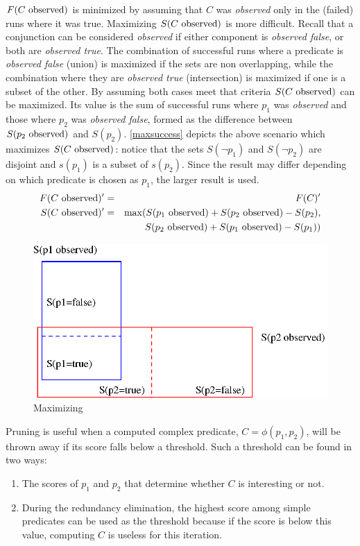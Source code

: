 $F(\text{$C$ observed})$ is minimized by assuming that $C$ was \textit{observed} only in the (failed) runs where it was true.  Maximizing $S(\text{$C$ observed})$ is more difficult.  Recall that a conjunction can be considered \textit{observed} if either component is \textit{observed false}, or both are \textit{observed true}.  The combination of successful runs where a predicate is \textit{observed false} (union) is maximized if the sets are non overlapping, while the combination where they are \textit{observed true} (intersection) is maximized if one is a subset of the other.  By assuming both cases meet that criteria $S(\text{$C$ observed})$ can be maximized.  Its value is the sum of successful runs where $p_1$ was \textit{observed} and those where $p_2$ was \textit{observed false}, formed as the difference between $S(\text{$p_2$ observed})$ and $S(p_2)$.  \autoref{maxsuccess} depicts the above scenario which maximizes $S(\text{$C$ observed})$: notice that the sets $S(\neg p_1)$ and $S(\neg p_2)$ are disjoint and $s(p_1)$ is a subset of $s(p_2)$.  Since the result may differ depending on which predicate is chosen as $p_1$, the larger result is used.
\begin{eqnarray*}
  F(\text{$C$ observed})' &=& F(C)' \\
  S(\text{$C$ observed})' &=&
  \max(S(\text{$p_1$ observed}) + S(\text{$p_2$ observed}) - S(p_2),\\
  & &\ \ \ \ S(\text{$p_2$ observed}) + S(\text{$p_1$ observed}) - S(p_1))
\end{eqnarray*}

\begin{figure}[h]
  \centering
  \includegraphics[scale = 0.6]{charts/maxsuccess}
  \caption{Maximizing }
  \label{maxsuccess}
\end{figure}


Pruning is useful when a computed complex predicate, $C = \phi(p_1, p_2)$, will be thrown away if its score falls below a threshold.  Such a threshold can be found in two ways:
\begin{enumerate}
\item The scores of $p_1$ and $p_2$ that determine whether $C$ is interesting or not.
\item During the redundancy elimination, the highest %
score among simple predicates can be used as the threshold because if the score is below this value, computing $C$ is useless for this iteration.
\end{enumerate}
